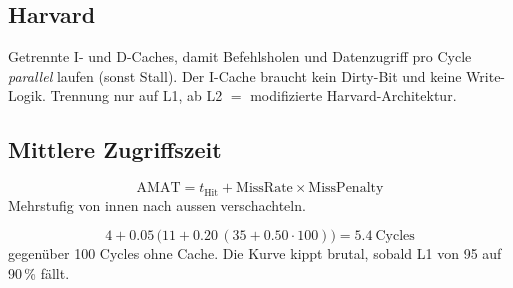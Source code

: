 \subsection{Harvard}
Getrennte I- und D-Caches, damit Befehlsholen und Datenzugriff pro Cycle
\emph{parallel} laufen (sonst Stall). Der I-Cache braucht kein Dirty-Bit
und keine Write-Logik. Trennung nur auf L1, ab L2 
$=$ modifizierte Harvard-Architektur.

\subsection{Mittlere Zugriffszeit}
\begin{formel}
\label{form:amat}
\[\text{AMAT}=t_{\text{Hit}}+\text{MissRate}\times\text{MissPenalty}\]
Mehrstufig von innen nach aussen verschachteln.
\end{formel}

\begin{bsp}
\[4+0.05\,\bigl(11+0.20\,(35+0.50\cdot100)\bigr)=5.4\ \text{Cycles}\]
gegenüber 100 Cycles ohne Cache. Die Kurve kippt brutal, sobald L1 von
95 auf 90\,\% fällt.
\end{bsp}
